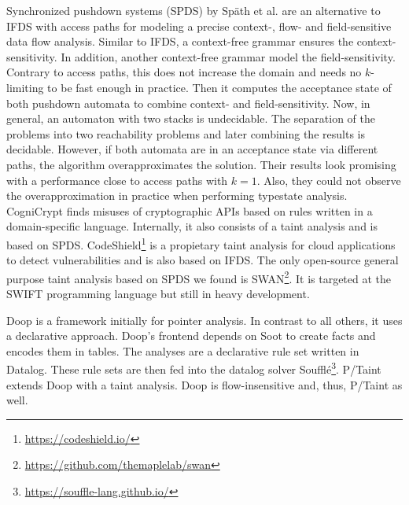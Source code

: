 \documentclass[../draft.tex]{subfiles}
\begin{document}
    Synchronized pushdown systems (SPDS) by Späth et al.\cite{Spaeth2019} are an alternative to IFDS with access paths for modeling a precise context-, flow- and field-sensitive data flow analysis. 
    Similar to IFDS, a context-free grammar ensures the context-sensitivity. 
    In addition, another context-free grammar model the field-sensitivity.
    Contrary to access paths, this does not increase the domain and needs no $k$-limiting to be fast enough in practice. 
    Then it computes the acceptance state of both pushdown automata to combine context- and field-sensitivity. 
    Now, in general, an automaton with two stacks is undecidable. The separation of the problems into two reachability problems and later combining the results is decidable. However, if both automata are in an acceptance state via different paths, the algorithm overapproximates the solution. 
    Their results look promising with a performance close to access paths with $k=1$.
    Also, they could not observe the overapproximation in practice when performing typestate analysis.\\
    CogniCrypt \cite{Krueger2017} finds misuses of cryptographic APIs based on rules written in a domain-specific language.
    Internally, it also consists of a taint analysis and is based on SPDS.
    CodeShield\footnote{\url{https://codeshield.io/}} is a propietary taint analysis for cloud applications to detect vulnerabilities and is also based on IFDS.
    The only open-source general purpose taint analysis based on SPDS we found is SWAN\footnote{\url{https://github.com/themaplelab/swan}}. It is targeted at the SWIFT programming language but still in heavy development.

    Doop\cite{Bravenboer2009} is a framework initially for pointer analysis. In contrast to all others, it uses a declarative approach. Doop's frontend depends on Soot to create facts and encodes them in tables. The analyses are a declarative rule set written in Datalog. These rule sets are then fed into the datalog solver Soufflé\footnote{\url{https://souffle-lang.github.io/}}. P/Taint\cite{Grech2017} extends Doop with a taint analysis. Doop is flow-insensitive and, thus, P/Taint as well.
\end{document}
